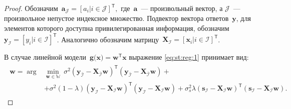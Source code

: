 \documentclass{dissert}
\begin{document}
\begin{proof}
Обозначим~$\mathbf{a}_{\mathcal{J}} = [a_i| i \in \mathcal{J}]^{\mathsf{T}},$ где~$\mathbf{a}$~--- произвольный вектор, а $\mathcal{J}$~--- произвольное непустое индексное множество. Подвектор вектора ответов~$\mathbf{y}$, для элементов которого доступна привилегированная информация, обозначим $\mathbf{y}_{\mathcal{I}} = [y_i| i \in \mathcal{I}]^{\mathsf{T}}$. Аналогично обозначим матрицу~$\mathbf{X}_\mathcal{I}=[\mathbf{x}_{i}| i \in \mathcal{I}]^{\mathsf{T}}$.

В случае линейной модели~$\mathbf{g}\bigr(\mathbf{x}\bigr) = \mathbf{w}^{\mathsf{T}}\mathbf{x}$ выражение \eqref{eq:st:reg:1} принимает вид:
\begin{gather}
\label{eq:st:reg:2}
\begin{aligned}
\hat{\mathbf{w}} = \arg&\min_{\mathbf{w}\in \mathbb{W}} ~ \sigma^2\left(\mathbf{y}_{\bar{\mathcal{I}}}-\mathbf{X}_{\bar{\mathcal{I}}}\mathbf{w}\right)^{\mathsf{T}}\left(\mathbf{y}_{\bar{\mathcal{I}}}-\mathbf{X}_{\bar{\mathcal{I}}}\mathbf{w}\right) +\\
&+ \sigma^2\left(1-\lambda\right)\left(\mathbf{y}_{\mathcal{I}}-\mathbf{X}_{\mathcal{I}}\mathbf{w}\right)^{\mathsf{T}}\left(\mathbf{y}_{\mathcal{I}}-\mathbf{X}_{\mathcal{I}}\mathbf{w}\right) + \sigma^2_s\lambda\left(\mathbf{s}_{\mathcal{I}}-\mathbf{X}_{\mathcal{I}}\mathbf{w}\right)^{\mathsf{T}}\left(\mathbf{s}_{\mathcal{I}}-\mathbf{X}_{\mathcal{I}}\mathbf{w}\right).
\end{aligned}
\end{gather}


\end{proof}
\end{document}
